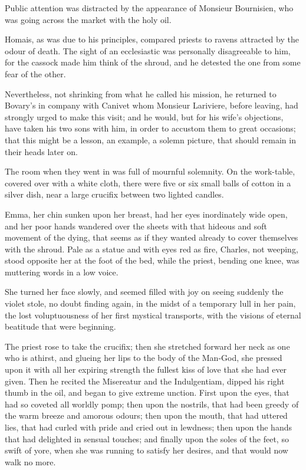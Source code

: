\documentclass[11pt,twocolumn]{ltugboat}
\begin{document}
Public attention was distracted by the appearance of Monsieur
Bournisien, who was going across the market with the holy oil.

Homais, as was due to his principles, compared priests to ravens
attracted by the odour of death. The sight of an ecclesiastic was
personally disagreeable to him, for the cassock made him think of the
shroud, and he detested the one from some fear of the other.

Nevertheless, not shrinking from what he called his mission, he returned
to Bovary's in company with Canivet whom Monsieur Lariviere, before
leaving, had strongly urged to make this visit; and he would, but for
his wife's objections, have taken his two sons with him, in order
to accustom them to great occasions; that this might be a lesson, an
example, a solemn picture, that should remain in their heads later on.

The room when they went in was full of mournful solemnity. On the
work-table, covered over with a white cloth, there were five or six
small balls of cotton in a silver dish, near a large crucifix between
two lighted candles.

Emma, her chin sunken upon her breast, had her eyes inordinately wide
open, and her poor hands wandered over the sheets with that hideous
and soft movement of the dying, that seems as if they wanted already to
cover themselves with the shroud. Pale as a statue and with eyes red as
fire, Charles, not weeping, stood opposite her at the foot of the bed,
while the priest, bending one knee, was muttering words in a low voice.

She turned her face slowly, and seemed filled with joy on seeing
suddenly the violet stole, no doubt finding again, in the midst of
a temporary lull in her pain, the lost voluptuousness of her first
mystical transports, with the visions of eternal beatitude that were
beginning.

The priest rose to take the crucifix; then she stretched forward her
neck as one who is athirst, and glueing her lips to the body of the
Man-God, she pressed upon it with all her expiring strength the fullest
kiss of love that she had ever given. Then he recited the Misereatur and
the Indulgentiam, dipped his right thumb in the oil, and began to give
extreme unction. First upon the eyes, that had so coveted all worldly
pomp; then upon the nostrils, that had been greedy of the warm breeze
and amorous odours; then upon the mouth, that had uttered lies, that had
curled with pride and cried out in lewdness; then upon the hands that
had delighted in sensual touches; and finally upon the soles of the
feet, so swift of yore, when she was running to satisfy her desires, and
that would now walk no more.
\end{document}
